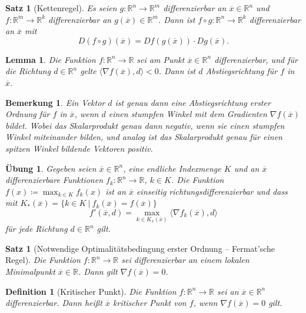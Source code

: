 \documentclass[11pt]{scrreprt}
\newcounter{thm}
\numberwithin{thm}{section}
\newtheorem{bemerkung}[thm]{Bemerkung}
\newtheorem{definition}[thm]{Definition}
\newtheorem{lemma}[thm]{Lemma}
\newtheorem{satz}[thm]{Satz}
\newtheorem{uebung}[thm]{Übung}
\begin{document}
\begin{satz}[Kettenregel]
	Es seien $g \colon \mathbb{R}^n \rightarrow \mathbb{R}^m$ differenzierbar an $\overline{x} \in \mathbb{R}^n$ und $f \colon \mathbb{R}^m \rightarrow \mathbb{R}^k$ differenzierbar an $g(\overline{x}) \in \mathbb{R}^m$. Dann ist $f \circ g \colon \mathbb{R}^n \rightarrow \mathbb{R}^k$ differenzierbar an $\overline{x}$ mit
	$$ D( f \circ g )(\overline{x}) = D f( g(\overline{x}) ) \cdot D g(\overline{x}). $$
\end{satz}

\begin{lemma}
	Die Funktion $f \colon \mathbb{R}^n \rightarrow \mathbb{R}$ sei am Punkt $\overline{x} \in \mathbb{R}^n$ differenzierbar, und für die Richtung $d \in \mathbb{R}^n$ gelte $\langle \nabla f(\overline{x}), d \rangle < 0$. Dann ist $d$ Abstiegsrichtung für $f$ in $\overline{x}$.
\end{lemma}

\begin{bemerkung}
	Ein Vektor $d$ ist genau dann eine Abstiegsrichtung erster Ordnung für $f$ in $\overline{x}$, wenn $d$ einen stumpfen Winkel mit dem Gradienten $\nabla f(\overline{x})$ bildet. Wobei das Skalarprodukt genau dann negativ, wenn sie einen stumpfen Winkel miteinander bilden, und analog ist das Skalarprodukt genau für einen spitzen Winkel bildende Vektoren positiv.	
\end{bemerkung}

\begin{uebung}
	Gegeben seien $\overline{x} \in \mathbb{R}^n$, eine endliche Indexmenge $K$ und an $\overline{x}$ differenzierbare Funktionen $f_k \colon \mathbb{R}^n\rightarrow \mathbb{R}$, $k \in K$. Die Funktion $f(x) \coloneqq \max_{k \in K} f_k(x)$ ist an $\overline{x}$ einseitig richtungsdifferenzierbar und dass mit $K_*(\overline{x}) = \{ k \in K ~|~f_k(\overline{x}) = f(\overline{x}) \}$
	$$ f'(\overline{x}, d) = \max_{k \in K_x(\overline{x})} \langle \nabla f_k(\overline{x}), d \rangle $$
	für jede Richtung $d \in \mathbb{R}^n$ gilt.
\end{uebung}

\begin{satz}[Notwendige Optimalitätsbedingung erster Ordnung – Fermat'sche Regel]
	Die Funktion $f \colon \mathbb{R}^n \rightarrow \mathbb{R}$ sei differenzierbar an einem lokalen Minimalpunkt $\overline{x} \in \mathbb{R}$. Dann gilt $\nabla f(\overline{x}) = 0$.
\end{satz}

\begin{definition}[Kritischer Punkt]
	Die Funktion $f \colon \mathbb{R}^n \rightarrow \mathbb{R}$ sei an $\overline{x} \in \mathbb{R}^n$ differenzierbar. Dann heißt $\overline{x}$ kritischer Punkt von $f$, wenn $\nabla f(\overline{x}) = 0$ gilt.
\end{definition}
\end{document}
